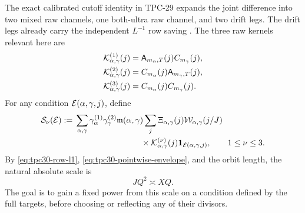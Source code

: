 The exact calibrated cutoff identity in TPC-29 expands the joint
difference into two mixed raw channels, one both-ultra raw channel,
and two drift legs.  The drift legs already carry the independent
$L^{-1}$ row saving \citep{WangTPC29}.  The three raw kernels relevant
here are
\begin{align}
 \mathcal K^{(1)}_{\alpha,\gamma}(j)
 &=\mathsf A_{m_\alpha,T}(j)C_{m_\gamma}(j),
 \notag\\
 \mathcal K^{(2)}_{\alpha,\gamma}(j)
 &=C_{m_\alpha}(j)\mathsf A_{m_\gamma,T}(j),
 \label{eq:tpc30-three-raw-kernels}\\
 \mathcal K^{(3)}_{\alpha,\gamma}(j)
 &=C_{m_\alpha}(j)C_{m_\gamma}(j).
 \notag
\end{align}
For any condition $\mathcal E(\alpha,\gamma,j)$, define
\begin{align}
 \mathcal S_\nu(\mathcal E)
 :={}&\sum_{\alpha,\gamma}
 \gamma_\alpha^{(1)}\gamma_\gamma^{(2)}
 \mathfrak m(\alpha,\gamma)
 \sum_j\Xi_{\alpha,\gamma}(j)
 \mathcal W_{\alpha,\gamma}(j/J)
 \notag\\
 &\hspace{8em}\times
 \mathcal K^{(\nu)}_{\alpha,\gamma}(j)
 \mathbf 1_{\mathcal E(\alpha,\gamma,j)},
 \qquad 1\le\nu\le3.
 \label{eq:tpc30-restricted-raw-channel}
\end{align}
By \eqref{eq:tpc30-row-l1},
\eqref{eq:tpc30-pointwise-envelope}, and the orbit length, the natural
absolute scale is
\begin{equation}
 JQ^2\asymp XQ.
 \label{eq:tpc30-natural-scale}
\end{equation}
The goal is to gain a fixed power from this scale on a condition
defined by the full targets, before choosing or reflecting any of
their divisors.
